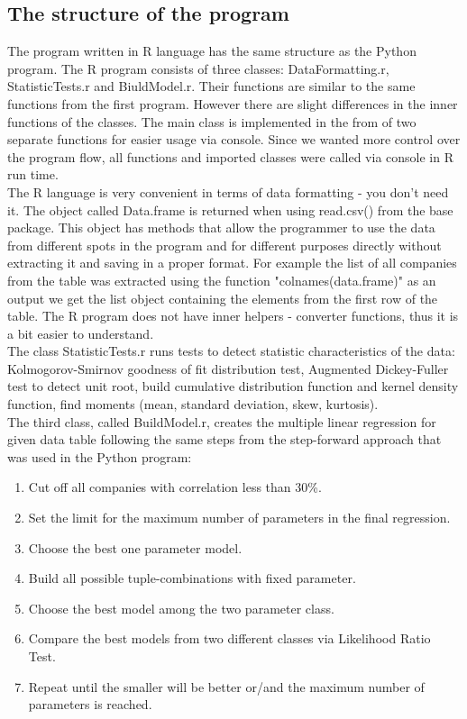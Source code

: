 \documentclass{article}
\begin{document}
\subsection{The structure of the program}
The program written in R language has the same structure as the Python program. The R program consists of three classes: DataFormatting.r, StatisticTests.r and BiuldModel.r. Their functions are similar to the same functions from the first program. However there are slight differences in the inner functions of the classes. The main class is implemented in the from of two separate functions for easier usage via console. Since we wanted more control over the program flow, all functions and imported classes were called via console in R run time.\\
The R language is very convenient in terms of data formatting - you don't need it. The object called Data.frame is returned when using read.csv() from the base package. This object has methods that allow the programmer to use the data from different spots in the program and for different purposes directly without extracting it and saving in a proper format. For example the list of all companies from the table was extracted using the function "colnames(data.frame)" as an output we get the list object containing the elements from the first row of the table. The R program does not have inner helpers - converter functions, thus it is a bit easier to understand.\\
The class StatisticTests.r runs tests to detect statistic characteristics of the data: Kolmogorov-Smirnov goodness of fit distribution test, Augmented Dickey-Fuller test to detect unit root, build cumulative distribution function and kernel density function, find moments (mean, standard deviation, skew, kurtosis).\\
The third class, called BuildModel.r, creates the multiple linear regression for given data table following the same steps from the step-forward approach that was used in the Python program:
\begin{enumerate}
    \item Cut off all companies with correlation less than 30\%.
    \item Set the limit for the maximum number of parameters in the final regression. 
    \item Choose the best one parameter model.
    \item Build all possible tuple-combinations with fixed parameter.
    \item Choose the best model among the two parameter class.
    \item Compare the best models from two different classes via Likelihood Ratio Test.
    \item Repeat until the smaller will be better or/and the maximum number of parameters is reached.
\end{enumerate}
\end{document}

